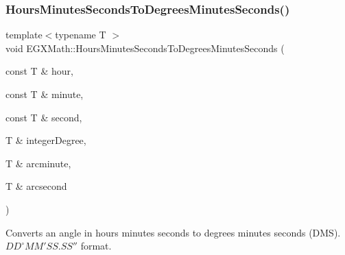 \mbox{\label{group___e_g_x_math-_angle_conversions-_hours_minutes_seconds_gae9eb0acc65dfe6119936f29ac292afaa}} 
\subsubsection{\texorpdfstring{Hours\+Minutes\+Seconds\+To\+Degrees\+Minutes\+Seconds()}{HoursMinutesSecondsToDegreesMinutesSeconds()}}
{\footnotesize\ttfamily template$<$typename T $>$ \\
void E\+G\+X\+Math\+::\+Hours\+Minutes\+Seconds\+To\+Degrees\+Minutes\+Seconds (\begin{DoxyParamCaption}\item[{const T \&}]{hour,  }\item[{const T \&}]{minute,  }\item[{const T \&}]{second,  }\item[{T \&}]{integer\+Degree,  }\item[{T \&}]{arcminute,  }\item[{T \&}]{arcsecond }\end{DoxyParamCaption})}



Converts an angle in hours minutes seconds to degrees minutes seconds (D\+MS). ${DD}^{\circ}{MM}'{SS.SS}''$ format. 

